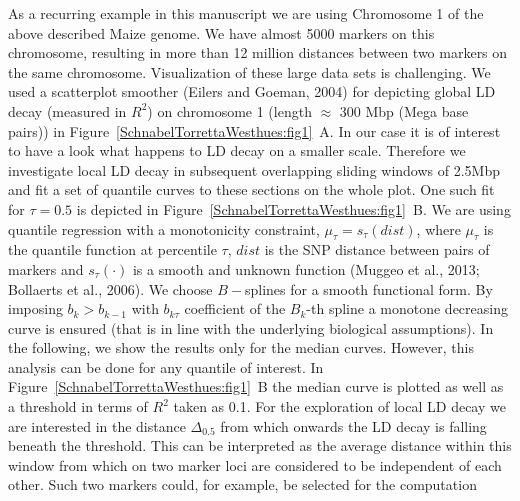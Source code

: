 \documentclass[twoside]{report}
\begin{document}
As a recurring example in this manuscript we are using Chromosome 1 of the above described 
Maize genome. We have almost 5000 markers on this chromosome, resulting in more than 12 million distances 
	between two markers on the same chromosome. Visualization of these large data sets is 
	challenging. We used a scatterplot smoother (Eilers and Goeman, 2004) for depicting
	global LD decay (measured in $R^2$) on chromosome 1 (length $\approx$ 300 Mbp (Mega base pairs))   
	in Figure~\ref{SchnabelTorrettaWesthues:fig1}~A. 
	In our case it is of interest to have a look what happens to 
	LD decay on a smaller scale. Therefore we investigate local LD decay in subsequent 
	overlapping sliding windows of 2.5Mbp and fit a set of quantile curves to these 
	sections on the whole plot. One such fit for $\tau = 0.5$ is depicted 
	in Figure~\ref{SchnabelTorrettaWesthues:fig1}~B. 
	We are using quantile 
	regression with a monotonicity constraint,
	$\mu_{\tau}=s_{\tau}(dist)$, where $\mu_\tau$ is the quantile function at 
	percentile $\tau$, $dist$ is the SNP distance between pairs of markers and 
	$s_{\tau}(\cdot)$ is a smooth and unknown function (Muggeo et al., 2013; Bollaerts et al., 2006). 
	We choose $B-$splines for a smooth functional form. By imposing 
	$b_k>b_{k-1}$ with $b_{k\tau}$ coefficient of the $B_k$-th spline 
%	
	a monotone decreasing curve is ensured (that is 
	in line with the underlying biological assumptions). In the following, we show the 
	results only for the median curves. However, this analysis can be done for any quantile 
	of interest. In Figure~\ref{SchnabelTorrettaWesthues:fig1}~B the median curve is 
	plotted as well as a threshold in terms of $R^2$ taken as 
	0.1. For the exploration of local LD decay we are interested in the distance $\Delta_{0.5}$ from 
	which onwards the LD decay is falling beneath the threshold. This can be interpreted as the
	average distance within this window from which on two marker loci are considered to be 
	independent of each other. Such two markers could, for example, be selected for the computation
\end{document}
